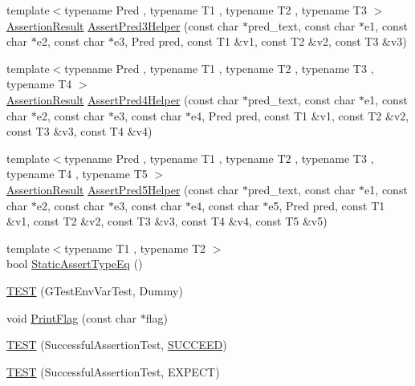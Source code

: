 \begin{DoxyCompactItemize}
{\footnotesize template$<$typename Pred , typename T1 , typename T2 , typename T3 $>$ }\\\hyperlink{classtesting_1_1AssertionResult}{\-Assertion\-Result} \hyperlink{namespacetesting_ac92dcbd00a0ffb2913e65d286e321a22}{\-Assert\-Pred3\-Helper} (const char $\ast$pred\-\_\-text, const char $\ast$e1, const char $\ast$e2, const char $\ast$e3, \-Pred pred, const \-T1 \&v1, const \-T2 \&v2, const \-T3 \&v3)
\item 
{\footnotesize template$<$typename Pred , typename T1 , typename T2 , typename T3 , typename T4 $>$ }\\\hyperlink{classtesting_1_1AssertionResult}{\-Assertion\-Result} \hyperlink{namespacetesting_ae90c778d69db4682e8fd8baaa0a9f9cd}{\-Assert\-Pred4\-Helper} (const char $\ast$pred\-\_\-text, const char $\ast$e1, const char $\ast$e2, const char $\ast$e3, const char $\ast$e4, \-Pred pred, const \-T1 \&v1, const \-T2 \&v2, const \-T3 \&v3, const \-T4 \&v4)
\item 
{\footnotesize template$<$typename Pred , typename T1 , typename T2 , typename T3 , typename T4 , typename T5 $>$ }\\\hyperlink{classtesting_1_1AssertionResult}{\-Assertion\-Result} \hyperlink{namespacetesting_addcf52b273ce17269cbf4956cfe600a6}{\-Assert\-Pred5\-Helper} (const char $\ast$pred\-\_\-text, const char $\ast$e1, const char $\ast$e2, const char $\ast$e3, const char $\ast$e4, const char $\ast$e5, \-Pred pred, const \-T1 \&v1, const \-T2 \&v2, const \-T3 \&v3, const \-T4 \&v4, const \-T5 \&v5)
\item 
{\footnotesize template$<$typename T1 , typename T2 $>$ }\\bool \hyperlink{namespacetesting_a5539306cf8f984daed507af0324b77bc}{\-Static\-Assert\-Type\-Eq} ()
\item 
\hyperlink{namespacetesting_af4187d1b48a2812f1335721ed8f30a99}{\-T\-E\-S\-T} (\-G\-Test\-Env\-Var\-Test, \-Dummy)
\item 
void \hyperlink{namespacetesting_a9863402455bfcf9be5fc0b1453a6d97d}{\-Print\-Flag} (const char $\ast$flag)
\item 
\hyperlink{namespacetesting_ae0cbea692840c88ab0b03285eb69ac97}{\-T\-E\-S\-T} (\-Successful\-Assertion\-Test, \hyperlink{include_2gtest_2gtest_8h_a75adcdf89f69b0b615e395daafc315af}{\-S\-U\-C\-C\-E\-E\-D})
\item 
\hyperlink{namespacetesting_af6c8f998f934372e5687d3998068e5e4}{\-T\-E\-S\-T} (\-Successful\-Assertion\-Test, \-E\-X\-P\-E\-C\-T)
\item 

\end{DoxyCompactItemize}
